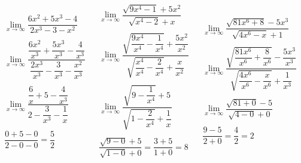 \documentclass[12pt]{article}
\begin{document}
\begin{center}
\[
\begin{array}{c|c|c}
  \begin{array}{c}
    \lim_{x \to \infty} \dfrac{6x^2 + 5x^3 - 4}{2x^3 - 3 - x^2} \\\\
    \lim_{x \to \infty} \dfrac{\dfrac{6x^2}{x^3} + \dfrac{5x^3}{x^3} - \dfrac{4}{x^3}}
                              {\dfrac{2x^3}{x^3} - \dfrac{3}{x^3} - \dfrac{x^2}{x^3}} \\\\
    \lim_{x \to \infty} \dfrac{\dfrac{6}{x} + 5 - \dfrac{4}{x^3}}
                              {2 - \dfrac{3}{x^3} - \dfrac{1}{x}} \\\\
    \dfrac{0 + 5 - 0}{2 - 0 - 0} = \dfrac{5}{2}
  \end{array}
  &
  \begin{array}{c}
    \lim_{x \to \infty} \dfrac{\sqrt{9x^4-1}+5x^2}{\sqrt{x^4-2}+x} \\\\
    \lim_{x \to \infty} \dfrac{\sqrt{\dfrac{9x^4}{x^4} - \dfrac{1}{x^4}} + \dfrac{5x^2}{x^2}}
                              {\sqrt{\dfrac{x^4}{x^4} - \dfrac{2}{x^4}} + \dfrac{x}{x^2}} \\\\
    \lim_{x \to \infty} \dfrac{\sqrt{9 - \dfrac{1}{x^4}} + 5}
                              {\sqrt{1 - \dfrac{2}{x^4}} + \dfrac{1}{x}} \\\\
    \dfrac{\sqrt{9 - 0} + 5}{\sqrt{1 - 0} + 0} = \dfrac{3 + 5}{1 + 0} = 8
  \end{array}
  &
  \begin{array}{c}
    \lim_{x \to \infty} \dfrac{\sqrt{81x^6 + 8} - 5x^3}{\sqrt{4x^6 -x} + 1} \\\\
    \lim_{x \to \infty} \dfrac{\sqrt{\dfrac{81x^6}{x^6} + \dfrac{8}{x^6}} - \dfrac{5x^3}{x^3}}
                              {\sqrt{\dfrac{4x^6}{x^6} - \dfrac{x}{x^6}} + \dfrac{1}{x^3}} \\\\
    \lim_{x \to \infty} \dfrac{\sqrt{81 + 0} - 5}
                              {\sqrt{4 - 0} + 0} \\\\
    \dfrac{9 - 5}{2 + 0} = \dfrac{4}{2} = 2
  \end{array}
\end{array}
\]
\end{center}
\end{document}
